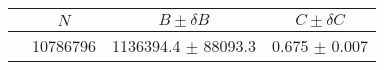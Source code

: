 \begin{tabular}{lccc}
\hline
    &   $N$   & $B \pm \delta B$  &  $C \pm \delta C$ \\
\hline
                               & 10786796   & 1136394.4  $\pm$ 88093.3 & 0.675      $\pm$ 0.007 \\
\hline
\end{tabular}
